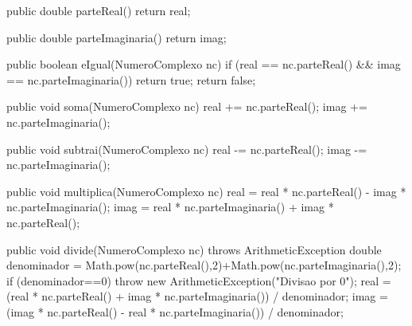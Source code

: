 \documentclass[onecolumn,a4paper,10pt]{report}
\newcommand{\+}{\, + \,}
\newcommand{\<}{\hspace*{-0.4cm}}
\begin{document}
\begin{enumerate}
{\begin{javacode}
{    public double parteReal() {
        return real;
    }
    
    public double parteImaginaria() {
        return imag;
    }
    
    public boolean eIgual(NumeroComplexo nc) {
        if (real == nc.parteReal() && imag == nc.parteImaginaria())
            return true;
        return false;
    }
    
    public void soma(NumeroComplexo nc) {
        real += nc.parteReal();
        imag += nc.parteImaginaria();
    }
    
    public void subtrai(NumeroComplexo nc) {
        real -= nc.parteReal();
        imag -= nc.parteImaginaria();
    }
    
    public void multiplica(NumeroComplexo nc) {
        real = real * nc.parteReal() - imag * nc.parteImaginaria();
        imag = real * nc.parteImaginaria() + imag * nc.parteReal();
    }
    
    public void divide(NumeroComplexo nc) throws ArithmeticException {
        double denominador = Math.pow(nc.parteReal(),2)+Math.pow(nc.parteImaginaria(),2);
        if (denominador==0)
            throw new ArithmeticException("Divisao por 0");
        real = (real * nc.parteReal() + imag * nc.parteImaginaria()) / denominador;
        imag = (imag * nc.parteReal() - real * nc.parteImaginaria()) / denominador;
    }

}
\end{javacode}
}

\end{enumerate}





\end{document}
